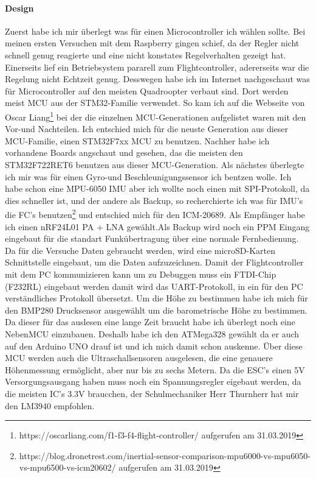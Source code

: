 \documentclass[12pt,a4paper, ngerman]{article}
\begin{document}
\paragraph{Design}
\iffalse
Zuerst habe ich mir überlegt was für einen Microcontroller ich wählen sollte. Bei meinen ersten Versuchen mit dem Raspberry gingen schief, da der Regler nicht schnell genug reagierte und eine nicht konstates Regelverhalten gezeigt hat. Einerseits lief ein Betriebsystem pararell zum Flightcontroller, adererseits war die Regelung nicht Echtzeit genug. Desswegen habe ich im Internet nachgeschaut was für Microcontroller auf den meisten Quadroopter verbaut sind. Dort werden  meist MCU aus der STM32-Familie verwendet. So kam ich auf die Webseite von Oscar Liang\footnote{\label{foot:1}https://oscarliang.com/f1-f3-f4-flight-controller/ aufgerufen am 31.03.2019} bei der die einzelnen MCU-Generationen aufgelistet waren mit den Vor-und Nachteilen. Ich entschied mich für die neuste Generation aus dieser MCU-Familie, einen STM32F7xx MCU zu benutzen. Nachher habe ich vorhandene Boards angschaut und gesehen, das die meisten den STM32F722RET6 benutzen aus dieser MCU-Generation. Als nächstes überlegte ich mir was für einen Gyro-und Beschleunigungssensor ich bentzen wolle. Ich habe schon eine MPU-6050 IMU aber ich wollte noch einen mit SPI-Protokoll, da dies schneller ist, und der andere als Backup, so recherchierte ich was für IMU's die FC's benutzen\footnote{\label{foot:2}https://blog.dronetrest.com/inertial-sensor-comparison-mpu6000-vs-mpu6050-vs-mpu6500-vs-icm20602/ aufgerufen am 31.03.2019} und entschied mich für den ICM-20689. Als Empfänger habe ich einen nRF24L01 PA + LNA gewählt.Als Backup wird noch ein PPM Eingang eingebaut für die standart Funkübertragung über eine normale Fernbedienung. Da für die Versuche Daten gebraucht werden, wird eine microSD-Karten Schnittstelle eingebaut, um die Daten aufzuzeichnen. Damit der Flightcontroller mit dem PC kommunizieren kann um zu Debuggen muss ein FTDI-Chip (F232RL) eingebaut werden damit wird das UART-Protokoll, in ein für den PC verständliches Protokoll übersetzt. Um die Höhe zu bestimmen habe ich mich für den BMP280 Drucksensor ausgewählt um die barometrische Höhe zu bestimmen. Da dieser für das auslesen eine lange Zeit braucht habe ich überlegt noch eine NebenMCU einzubauen. Deshalb habe ich den ATMega328 gewählt da er auch auf den Arduino UNO drauf ist und ich mich damit schon auskenne. Über diese MCU werden auch die Ultraschallsensoren ausgelesen, die eine genauere Höhenmessung ermöglicht, aber nur bis zu sechs Metern. Da die ESC's einen 5V Versorgungsausgang haben muss noch ein Spannungsregler  eigebaut werden, da die meisten IC's 3.3V braucchen, der Schulmechaniker Herr Thurnherr hat mir den LM3940 empfohlen.
\end{document}
